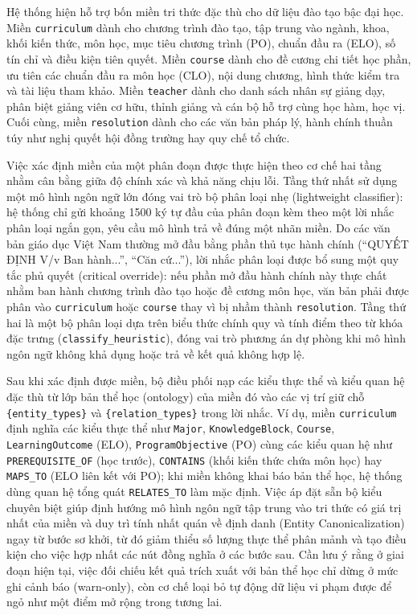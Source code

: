 \indent Hệ thống hiện hỗ trợ bốn miền tri thức đặc thù cho dữ liệu đào tạo bậc đại học. Miền \texttt{curriculum} dành cho chương trình đào tạo, tập trung vào ngành, khoa, khối kiến thức, môn học, mục tiêu chương trình (PO), chuẩn đầu ra (ELO), số tín chỉ và điều kiện tiên quyết. Miền \texttt{course} dành cho đề cương chi tiết học phần, ưu tiên các chuẩn đầu ra môn học (CLO), nội dung chương, hình thức kiểm tra và tài liệu tham khảo. Miền \texttt{teacher} dành cho danh sách nhân sự giảng dạy, phân biệt giảng viên cơ hữu, thỉnh giảng và cán bộ hỗ trợ cùng học hàm, học vị. Cuối cùng, miền \texttt{resolution} dành cho các văn bản pháp lý, hành chính thuần túy như nghị quyết hội đồng trường hay quy chế tổ chức.

\indent Việc xác định miền của một phân đoạn được thực hiện theo cơ chế hai tầng nhằm cân bằng giữa độ chính xác và khả năng chịu lỗi. Tầng thứ nhất sử dụng một mô hình ngôn ngữ lớn đóng vai trò bộ phân loại nhẹ (lightweight classifier): hệ thống chỉ gửi khoảng 1500 ký tự đầu của phân đoạn kèm theo một lời nhắc phân loại ngắn gọn, yêu cầu mô hình trả về đúng một nhãn miền. Do các văn bản giáo dục Việt Nam thường mở đầu bằng phần thủ tục hành chính (``QUYẾT ĐỊNH V/v Ban hành...'', ``Căn cứ...''), lời nhắc phân loại được bổ sung một quy tắc phủ quyết (critical override): nếu phần mở đầu hành chính này thực chất nhằm ban hành chương trình đào tạo hoặc đề cương môn học, văn bản phải được phân vào \texttt{curriculum} hoặc \texttt{course} thay vì bị nhầm thành \texttt{resolution}. Tầng thứ hai là một bộ phân loại dựa trên biểu thức chính quy và tính điểm theo từ khóa đặc trưng (\texttt{classify\_heuristic}), đóng vai trò phương án dự phòng khi mô hình ngôn ngữ không khả dụng hoặc trả về kết quả không hợp lệ.

\indent Sau khi xác định được miền, bộ điều phối nạp các kiểu thực thể và kiểu quan hệ đặc thù từ lớp bản thể học (ontology) của miền đó vào các vị trí giữ chỗ \texttt{\{entity\_types\}} và \texttt{\{relation\_types\}} trong lời nhắc. Ví dụ, miền \texttt{curriculum} định nghĩa các kiểu thực thể như \texttt{Major}, \texttt{KnowledgeBlock}, \texttt{Course}, \texttt{LearningOutcome} (ELO), \texttt{ProgramObjective} (PO) cùng các kiểu quan hệ như \texttt{PREREQUISITE\_OF} (học trước), \texttt{CONTAINS} (khối kiến thức chứa môn học) hay \texttt{MAPS\_TO} (ELO liên kết với PO); khi miền không khai báo bản thể học, hệ thống dùng quan hệ tổng quát \texttt{RELATES\_TO} làm mặc định. Việc áp đặt sẵn bộ kiểu chuyên biệt giúp định hướng mô hình ngôn ngữ tập trung vào tri thức có giá trị nhất của miền và duy trì tính nhất quán về định danh (Entity Canonicalization) ngay từ bước sơ khởi, từ đó giảm thiểu số lượng thực thể phân mảnh và tạo điều kiện cho việc hợp nhất các nút đồng nghĩa ở các bước sau. Cần lưu ý rằng ở giai đoạn hiện tại, việc đối chiếu kết quả trích xuất với bản thể học chỉ dừng ở mức ghi cảnh báo (warn-only), còn cơ chế loại bỏ tự động dữ liệu vi phạm được để ngỏ như một điểm mở rộng trong tương lai.

